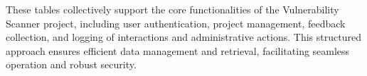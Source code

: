 These tables collectively support the core functionalities of the Vulnerability Scanner project, including user authentication, project management, feedback collection, and logging of interactions and administrative actions. This structured approach ensures efficient data management and retrieval, facilitating seamless operation and robust security.









